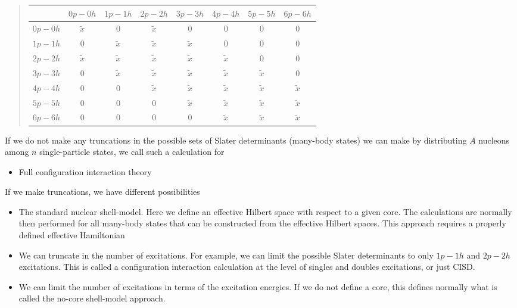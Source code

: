 \documentclass[%
twoside,                 %
final,                   %
10pt]{article}
\begin{document}
\begin{quote}
\begin{tabular}{cccccccc}
\hline
\multicolumn{1}{c}{  } & \multicolumn{1}{c}{ $0p-0h$ } & \multicolumn{1}{c}{ $1p-1h$ } & \multicolumn{1}{c}{ $2p-2h$ } & \multicolumn{1}{c}{ $3p-3h$ } & \multicolumn{1}{c}{ $4p-4h$ } & \multicolumn{1}{c}{ $5p-5h$ } & \multicolumn{1}{c}{ $6p-6h$ } \\
\hline
$0p-0h$ & $\tilde{x}$ & 0           & $\tilde{x}$ & 0           & 0           & 0           & 0           \\
$1p-1h$ & 0           & $\tilde{x}$ & $\tilde{x}$ & $\tilde{x}$ & 0           & 0           & 0           \\
$2p-2h$ & $\tilde{x}$ & $\tilde{x}$ & $\tilde{x}$ & $\tilde{x}$ & $\tilde{x}$ & 0           & 0           \\
$3p-3h$ & 0           & $\tilde{x}$ & $\tilde{x}$ & $\tilde{x}$ & $\tilde{x}$ & $\tilde{x}$ & 0           \\
$4p-4h$ & 0           & 0           & $\tilde{x}$ & $\tilde{x}$ & $\tilde{x}$ & $\tilde{x}$ & $\tilde{x}$ \\
$5p-5h$ & 0           & 0           & 0           & $\tilde{x}$ & $\tilde{x}$ & $\tilde{x}$ & $\tilde{x}$ \\
$6p-6h$ & 0           & 0           & 0           & 0           & $\tilde{x}$ & $\tilde{x}$ & $\tilde{x}$ \\
\hline
\end{tabular}
\end{quote}

\noindent
If we do not make any truncations in the possible sets of Slater determinants (many-body states) we can make by distributing $A$ nucleons among $n$ single-particle states, we call such a calculation for 
\begin{itemize}
\item Full configuration interaction theory
\end{itemize}

\noindent
If we make truncations, we have different possibilities

\begin{itemize}
\item The standard nuclear shell-model. Here we define an effective Hilbert space with respect to a given core. The calculations are normally then performed for all many-body states that can be constructed from the effective Hilbert spaces. This approach requires a properly defined effective Hamiltonian

\item We can truncate in the number of excitations. For example, we can limit the possible Slater determinants to only $1p-1h$ and $2p-2h$ excitations. This is called a configuration interaction calculation at the level of singles and doubles excitations, or just CISD. 

\item We can limit the number of excitations in terms of the excitation energies. If we do not define a core, this defines normally what is called the no-core shell-model approach. 
\end{itemize}
\end{document}
